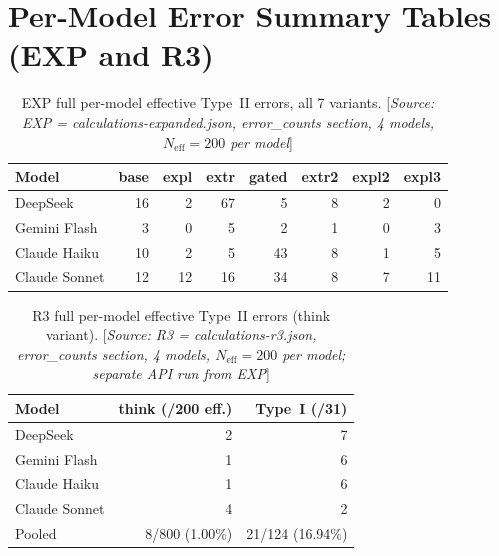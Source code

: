 \documentclass[11pt,a4paper]{article}
\begin{document}
\section{Per-Model Error Summary Tables (EXP and R3)}
\label{app:fulltables}

\begin{table}[htbp]
\centering
\caption{EXP full per-model effective Type~II errors, all 7 variants.
  [\emph{Source: EXP = calculations-expanded.json, error\_counts section,
  4 models, $N_\text{eff} = 200$ per model}]}
\label{tab:b1}
\smallskip
\begin{tabular}{@{}lrrrrrrr@{}}
\toprule
Model
  & \textsf{base}
  & \textsf{expl}
  & \textsf{extr}
  & \textsf{gated}
  & \textsf{extr2}
  & \textsf{expl2}
  & \textsf{expl3} \\
\midrule
DeepSeek      & 16 &  2 & 67 &  5 &  8 &  2 &  0 \\
Gemini Flash  &  3 &  0 &  5 &  2 &  1 &  0 &  3 \\
Claude Haiku  & 10 &  2 &  5 & 43 &  8 &  1 &  5 \\
Claude Sonnet & 12 & 12 & 16 & 34 &  8 &  7 & 11 \\
\bottomrule
\end{tabular}
\end{table}

\begin{table}[htbp]
\centering
\caption{R3 full per-model effective Type~II errors (\textsf{think} variant).
  [\emph{Source: R3 = calculations-r3.json, error\_counts section,
  4 models, $N_\text{eff} = 200$ per model; separate API run from EXP}]}
\label{tab:b_r3}
\smallskip
\begin{tabular}{@{}lrr@{}}
\toprule
Model & \textsf{think} (/200 eff.) & Type~I (/31) \\
\midrule
DeepSeek       & 2 & 7 \\
Gemini Flash   & 1 & 6 \\
Claude Haiku   & 1 & 6 \\
Claude Sonnet  & 4 & 2 \\
\midrule
Pooled & 8/800 (1.00\%) & 21/124 (16.94\%) \\
\bottomrule
\end{tabular}
\end{table}
\end{document}
